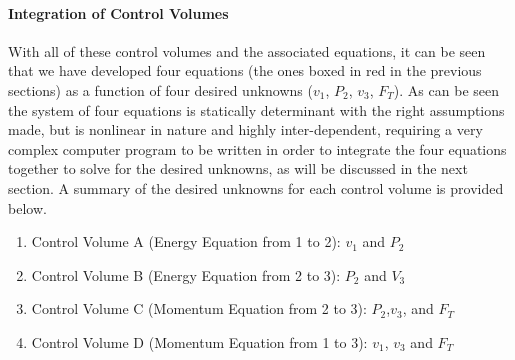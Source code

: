\documentclass{report}
\begin{document}
\paragraph{Integration of Control Volumes}
With all of these control volumes and the associated equations, it can be seen that we have developed four equations (the ones boxed in red in the previous sections) as a function of four desired unknowns ($v_1$, $P_2$, $v_3$, $F_T$).  As can be seen the system of four equations is statically determinant with the right assumptions made, but is nonlinear in nature and highly inter-dependent, requiring a very complex computer program to be written in order to integrate the four equations together to solve for the desired unknowns, as will be discussed in the next section.  A summary of the desired unknowns for each control volume is provided below.
\begin{enumerate}
\item Control Volume A (Energy Equation from 1 to 2): $v_1$ and $P_2$
\item Control Volume B (Energy Equation from 2 to 3): $P_2$ and $V_3$
\item Control Volume C (Momentum Equation from 2 to 3): $P_2$,$v_3$, and $F_T$
\item Control Volume D (Momentum Equation from 1 to 3): $v_1$, $v_3$ and $F_T$
\end{enumerate}
\end{document}
